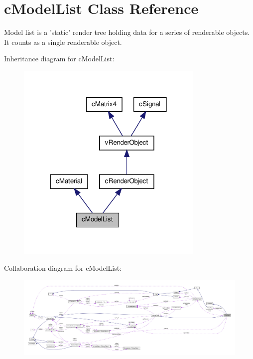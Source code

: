 \hypertarget{classc_model_list}{
\section{cModelList Class Reference}
\label{classc_model_list}
}


Model list is a 'static' render tree holding data for a series of renderable objects. It counts as a single renderable object.  




Inheritance diagram for cModelList:
\nopagebreak
\begin{figure}[H]
\begin{center}
\leavevmode
\includegraphics[width=254pt]{classc_model_list__inherit__graph}
\end{center}
\end{figure}


Collaboration diagram for cModelList:
\nopagebreak
\begin{figure}[H]
\begin{center}
\leavevmode
\includegraphics[width=400pt]{classc_model_list__coll__graph}
\end{center}
\end{figure}
